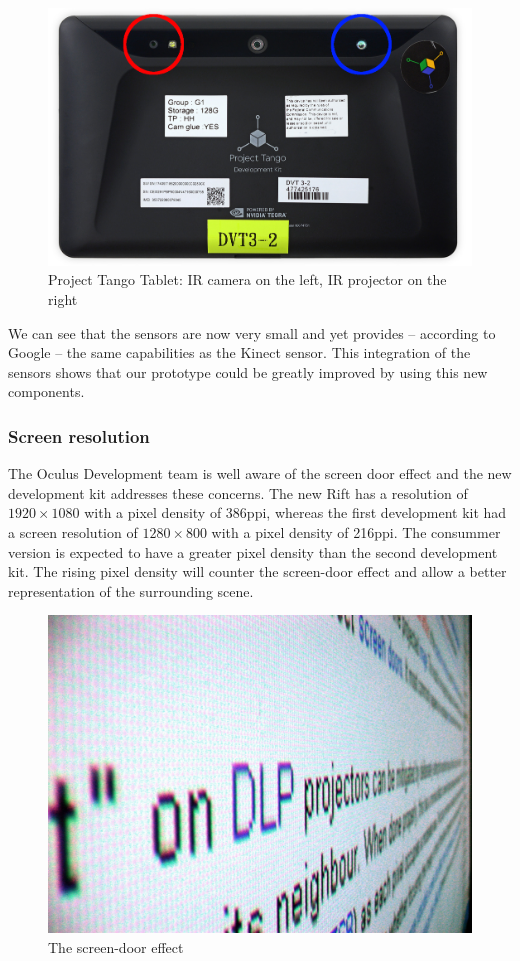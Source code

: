 \documentclass[12pt]{article}
\begin{document}
\begin{figure}[!h]
  \centering
  \includegraphics[scale=0.27]{TangoTab.jpeg}
  \caption{\label{fig:tangotablet} Project Tango Tablet: IR camera on the left, IR projector on the right}
\end{figure}

We can see that the sensors are now very small and yet provides -- according to Google -- the same capabilities as the Kinect sensor. This integration of the sensors shows that our prototype could be greatly improved by using this new components.

\subsubsection{Screen resolution}
The Oculus Development team is well aware of the screen door effect and the new development kit addresses these concerns. The new Rift has a resolution of $1920\times 1080$ with a pixel density of 386ppi, whereas the first development kit had a screen resolution of $1280\times 800$ with a pixel density of 216ppi. The consummer version is expected to have a greater pixel density than the second development kit. The rising pixel density will counter the screen-door effect and allow a better representation of the surrounding scene.

\begin{figure}[!h]
  \centering
  \includegraphics[scale=0.1]{Screen-door_effect.jpg}
  \caption{\label{fig:sdeffect} The screen-door effect}
\end{figure}
\end{document}
